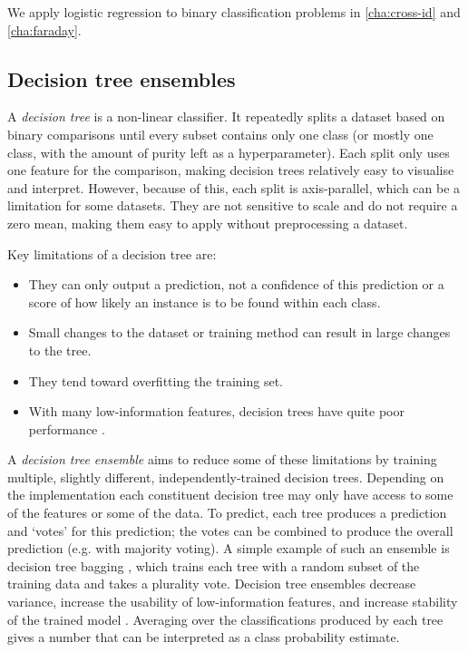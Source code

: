 \documentclass[11pt, a4paper]{book}
\newcommand{\defn}[1]{\emph{#1}}
\begin{document}
        We apply logistic regression to binary classification problems in \autoref{cha:cross-id} and \autoref{cha:faraday}.

    \subsection{Decision tree ensembles}
    \label{sec:decision-trees}

        A \defn{decision tree} is a non-linear classifier. It repeatedly splits a dataset based on binary comparisons until every subset contains only one class (or mostly one class, with the amount of purity left as a hyperparameter). Each split only uses one feature for the comparison, making decision trees relatively easy to visualise and interpret. However, because of this, each split is axis-parallel, which can be a limitation for some datasets. They are not sensitive to scale and do not require a zero mean, making them easy to apply without preprocessing a dataset.

        Key limitations of a decision tree are:
        \begin{itemize}
            \item They can only output a prediction, not a confidence of this prediction or a score of how likely an instance is to be found within each class.
            \item Small changes to the dataset or training method can result in large changes to the tree.
            \item They tend toward overfitting the training set.
            \item With many low-information features, decision trees have quite poor performance \citep{breiman01random-forest}.
        \end{itemize}

        A \defn{decision tree ensemble} aims to reduce some of these limitations by training multiple, slightly different, independently-trained decision trees. Depending on the implementation each constituent decision tree may only have access to some of the features or some of the data. To predict, each tree produces a prediction and `votes' for this prediction; the votes can be combined to produce the overall prediction (e.g. with majority voting). A simple example of such an ensemble is decision tree bagging \citep{breiman_bagging_1996}, which trains each tree with a random subset of the training data and takes a plurality vote. Decision tree ensembles decrease variance, increase the usability of low-information features, and increase stability of the trained model \citep{breiman01random-forest}. Averaging over the classifications produced by each tree gives a number that can be interpreted as a class probability estimate.
\end{document}
